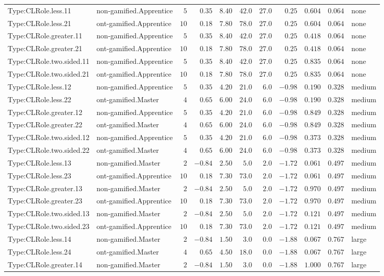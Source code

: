 \documentclass[6pt,a4paper]{article}
\begin{document}
{\begin{longtable}{llrrrrrrrrl}
Type:CLRole.less.11&non-gamified.Apprentice&$ 5$&$ 0.35$&$ 8.40$&$ 42.0$&$27.0$&$ 0.25$&$0.604$&$0.064$&none\tabularnewline
Type:CLRole.less.21&ont-gamified.Apprentice&$10$&$ 0.18$&$ 7.80$&$ 78.0$&$27.0$&$ 0.25$&$0.604$&$0.064$&none\tabularnewline
Type:CLRole.greater.11&non-gamified.Apprentice&$ 5$&$ 0.35$&$ 8.40$&$ 42.0$&$27.0$&$ 0.25$&$0.418$&$0.064$&none\tabularnewline
Type:CLRole.greater.21&ont-gamified.Apprentice&$10$&$ 0.18$&$ 7.80$&$ 78.0$&$27.0$&$ 0.25$&$0.418$&$0.064$&none\tabularnewline
Type:CLRole.two.sided.11&non-gamified.Apprentice&$ 5$&$ 0.35$&$ 8.40$&$ 42.0$&$27.0$&$ 0.25$&$0.835$&$0.064$&none\tabularnewline
Type:CLRole.two.sided.21&ont-gamified.Apprentice&$10$&$ 0.18$&$ 7.80$&$ 78.0$&$27.0$&$ 0.25$&$0.835$&$0.064$&none\tabularnewline
Type:CLRole.less.12&non-gamified.Apprentice&$ 5$&$ 0.35$&$ 4.20$&$ 21.0$&$ 6.0$&$-0.98$&$0.190$&$0.328$&medium\tabularnewline
Type:CLRole.less.22&ont-gamified.Master&$ 4$&$ 0.65$&$ 6.00$&$ 24.0$&$ 6.0$&$-0.98$&$0.190$&$0.328$&medium\tabularnewline
Type:CLRole.greater.12&non-gamified.Apprentice&$ 5$&$ 0.35$&$ 4.20$&$ 21.0$&$ 6.0$&$-0.98$&$0.849$&$0.328$&medium\tabularnewline
Type:CLRole.greater.22&ont-gamified.Master&$ 4$&$ 0.65$&$ 6.00$&$ 24.0$&$ 6.0$&$-0.98$&$0.849$&$0.328$&medium\tabularnewline
Type:CLRole.two.sided.12&non-gamified.Apprentice&$ 5$&$ 0.35$&$ 4.20$&$ 21.0$&$ 6.0$&$-0.98$&$0.373$&$0.328$&medium\tabularnewline
Type:CLRole.two.sided.22&ont-gamified.Master&$ 4$&$ 0.65$&$ 6.00$&$ 24.0$&$ 6.0$&$-0.98$&$0.373$&$0.328$&medium\tabularnewline
Type:CLRole.less.13&non-gamified.Master&$ 2$&$-0.84$&$ 2.50$&$  5.0$&$ 2.0$&$-1.72$&$0.061$&$0.497$&medium\tabularnewline
Type:CLRole.less.23&ont-gamified.Apprentice&$10$&$ 0.18$&$ 7.30$&$ 73.0$&$ 2.0$&$-1.72$&$0.061$&$0.497$&medium\tabularnewline
Type:CLRole.greater.13&non-gamified.Master&$ 2$&$-0.84$&$ 2.50$&$  5.0$&$ 2.0$&$-1.72$&$0.970$&$0.497$&medium\tabularnewline
Type:CLRole.greater.23&ont-gamified.Apprentice&$10$&$ 0.18$&$ 7.30$&$ 73.0$&$ 2.0$&$-1.72$&$0.970$&$0.497$&medium\tabularnewline
Type:CLRole.two.sided.13&non-gamified.Master&$ 2$&$-0.84$&$ 2.50$&$  5.0$&$ 2.0$&$-1.72$&$0.121$&$0.497$&medium\tabularnewline
Type:CLRole.two.sided.23&ont-gamified.Apprentice&$10$&$ 0.18$&$ 7.30$&$ 73.0$&$ 2.0$&$-1.72$&$0.121$&$0.497$&medium\tabularnewline
Type:CLRole.less.14&non-gamified.Master&$ 2$&$-0.84$&$ 1.50$&$  3.0$&$ 0.0$&$-1.88$&$0.067$&$0.767$&large\tabularnewline
Type:CLRole.less.24&ont-gamified.Master&$ 4$&$ 0.65$&$ 4.50$&$ 18.0$&$ 0.0$&$-1.88$&$0.067$&$0.767$&large\tabularnewline
Type:CLRole.greater.14&non-gamified.Master&$ 2$&$-0.84$&$ 1.50$&$  3.0$&$ 0.0$&$-1.88$&$1.000$&$0.767$&large\tabularnewline

\end{longtable}}
\end{document}
